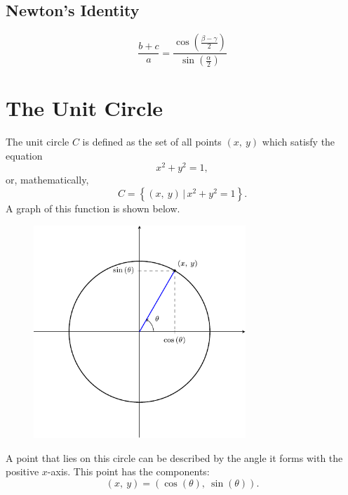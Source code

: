 \documentclass{article}
\begin{document}
\subsection{Newton's Identity}
\begin{equation*}
    \frac{b+c}{a}=\frac{\cos{\left( \frac{\beta-\gamma}{2} \right)}}{\sin{\left( \frac{\alpha}{2} \right)}}
\end{equation*}
\section{The Unit Circle}
The unit circle \(C\) is defined as the set of all points \(\left( x,\: y \right)\)
which satisfy the equation
\begin{equation*}
    x^2 + y^2 = 1,
\end{equation*}
or, mathematically,
\begin{equation*}
    C = \left\{ \left( x,\: y \right) \,\vert\, x^2 + y^2 = 1 \right\}.
\end{equation*}
A graph of this function is shown below.
\begin{figure}[H]
    \centering
    \includegraphics[width=8cm]{figures/unit-circle.pdf}
\end{figure}
A point that lies on this circle can be described by the angle it forms
with the positive \(x\)-axis. This point has the components:
\begin{equation*}
    \left( x,\: y \right) = \left( \cos{\left( \theta \right)},\: \sin{\left( \theta \right)} \right).
\end{equation*}
\end{document}
